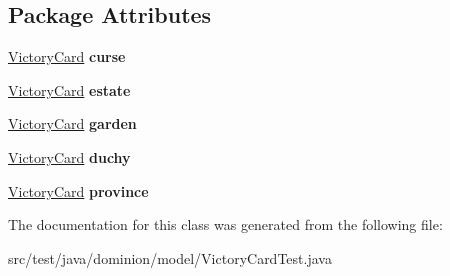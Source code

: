 \subsection*{\-Package \-Attributes}
\begin{DoxyCompactItemize}
\item 
\hypertarget{classdominion_1_1model_1_1VictoryCardTest_a14cc653072e0a70d8dcedb6b856dc2a0}{\hyperlink{interfacedominion_1_1model_1_1cards_1_1VictoryCard_1_1VictoryCard}{\-Victory\-Card} {\bfseries curse}}\label{classdominion_1_1model_1_1VictoryCardTest_a14cc653072e0a70d8dcedb6b856dc2a0}

\item 
\hypertarget{classdominion_1_1model_1_1VictoryCardTest_ae619676f5d335608a89164f7b87354d2}{\hyperlink{interfacedominion_1_1model_1_1cards_1_1VictoryCard_1_1VictoryCard}{\-Victory\-Card} {\bfseries estate}}\label{classdominion_1_1model_1_1VictoryCardTest_ae619676f5d335608a89164f7b87354d2}

\item 
\hypertarget{classdominion_1_1model_1_1VictoryCardTest_a228a1d57c91badb8752c4b897ae1c644}{\hyperlink{interfacedominion_1_1model_1_1cards_1_1VictoryCard_1_1VictoryCard}{\-Victory\-Card} {\bfseries garden}}\label{classdominion_1_1model_1_1VictoryCardTest_a228a1d57c91badb8752c4b897ae1c644}

\item 
\hypertarget{classdominion_1_1model_1_1VictoryCardTest_a27484d7cc438b9846d280e0cf7d4e9e9}{\hyperlink{interfacedominion_1_1model_1_1cards_1_1VictoryCard_1_1VictoryCard}{\-Victory\-Card} {\bfseries duchy}}\label{classdominion_1_1model_1_1VictoryCardTest_a27484d7cc438b9846d280e0cf7d4e9e9}

\item 
\hypertarget{classdominion_1_1model_1_1VictoryCardTest_a519b56a1807eb72e51315a85375cbacd}{\hyperlink{interfacedominion_1_1model_1_1cards_1_1VictoryCard_1_1VictoryCard}{\-Victory\-Card} {\bfseries province}}\label{classdominion_1_1model_1_1VictoryCardTest_a519b56a1807eb72e51315a85375cbacd}

\end{DoxyCompactItemize}


\-The documentation for this class was generated from the following file\-:\begin{DoxyCompactItemize}
\item 
src/test/java/dominion/model/\-Victory\-Card\-Test.\-java\end{DoxyCompactItemize}
